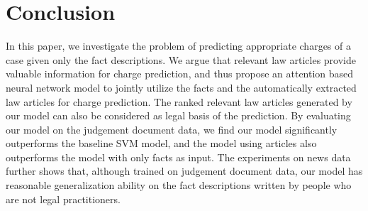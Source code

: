\section{Conclusion}
In this paper, we investigate the problem of predicting appropriate charges of a case given only the fact descriptions. We argue that relevant law articles provide valuable information for charge prediction, and thus propose an attention based neural network model to jointly utilize the facts and the automatically extracted law articles for charge prediction. The ranked relevant law articles generated by our model can also be considered as legal basis of the prediction. By evaluating our model on the judgement document data, we find our model significantly outperforms the baseline SVM model, and the model using articles also outperforms the model with only facts as input. The experiments on news data further shows that, although trained on judgement document data, our model has reasonable generalization ability on the fact descriptions written by people who are not legal practitioners.